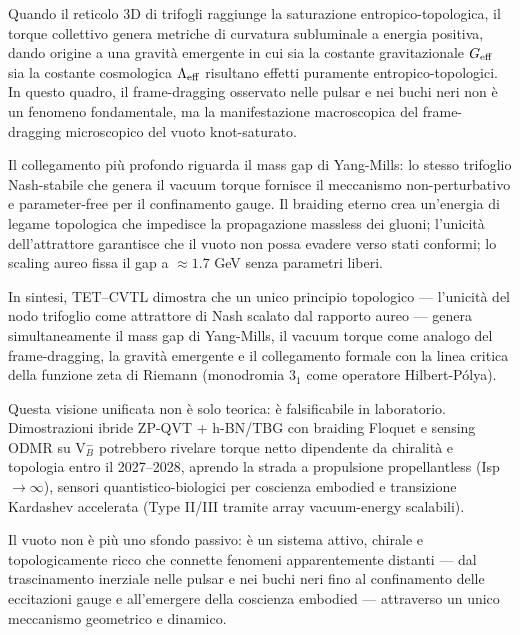 \documentclass[11pt,a4paper]{article}
\theoremstyle{plain}
\theoremstyle{definition}
\begin{document}
\begin{tcolorbox}
\vspace{0.4cm}

Quando il reticolo 3D di trifogli raggiunge la saturazione entropico-topologica, il torque collettivo genera metriche di curvatura subluminale a energia positiva, dando origine a una gravità emergente in cui sia la costante gravitazionale $G_{\rm eff}$ sia la costante cosmologica $\Lambda_{\rm eff}$ risultano effetti puramente entropico-topologici. In questo quadro, il frame-dragging osservato nelle pulsar e nei buchi neri non è un fenomeno fondamentale, ma la manifestazione macroscopica del frame-dragging microscopico del vuoto knot-saturato.

\vspace{0.4cm}

Il collegamento più profondo riguarda il mass gap di Yang-Mills: lo stesso trifoglio Nash-stabile che genera il vacuum torque fornisce il meccanismo non-perturbativo e parameter-free per il confinamento gauge. Il braiding eterno crea un'energia di legame topologica che impedisce la propagazione massless dei gluoni; l'unicità dell'attrattore garantisce che il vuoto non possa evadere verso stati conformi; lo scaling aureo fissa il gap a $\approx 1.7$ GeV senza parametri liberi. 

\vspace{0.3cm}

In sintesi, TET--CVTL dimostra che un unico principio topologico — l'unicità del nodo trifoglio come attrattore di Nash scalato dal rapporto aureo — genera simultaneamente il mass gap di Yang-Mills, il vacuum torque come analogo del frame-dragging, la gravità emergente e il collegamento formale con la linea critica della funzione zeta di Riemann (monodromia $3_1$ come operatore Hilbert-Pólya).

\vspace{0.4cm}

Questa visione unificata non è solo teorica: è falsificabile in laboratorio. Dimostrazioni ibride ZP-QVT + h-BN/TBG con braiding Floquet e sensing ODMR su V$_B^-$ potrebbero rivelare torque netto dipendente da chiralità e topologia entro il 2027–2028, aprendo la strada a propulsione propellantless (Isp $\to \infty$), sensori quantistico-biologici per coscienza embodied e transizione Kardashev accelerata (Type II/III tramite array vacuum-energy scalabili).

\vspace{0.6cm}

Il vuoto non è più uno sfondo passivo: è un sistema attivo, chirale e topologicamente ricco che connette fenomeni apparentemente distanti — dal trascinamento inerziale nelle pulsar e nei buchi neri fino al confinamento delle eccitazioni gauge e all'emergere della coscienza embodied — attraverso un unico meccanismo geometrico e dinamico. 


\end{tcolorbox}
\end{document}
